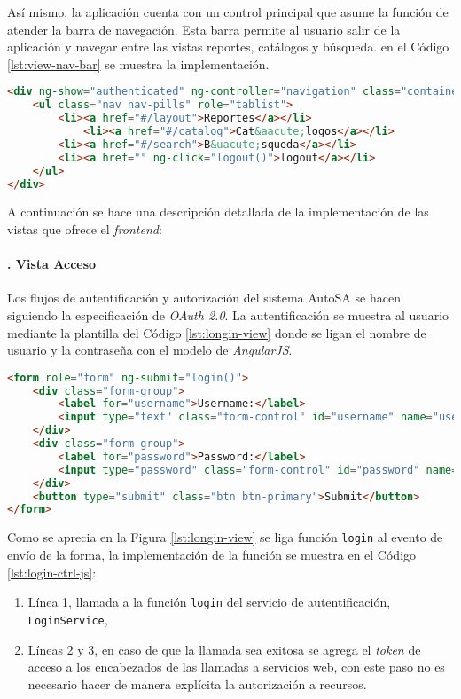 Así mismo, la aplicación cuenta con un control principal que asume la función de atender la barra de navegación. Esta barra permite al usuario salir de la aplicación y navegar entre las vistas reportes, catálogos y búsqueda. en el Código \ref{lst:view-nav-bar} se muestra la implementación.

\begin{lstlisting}[language=HTML, captionpos=b, caption={Barra de navegación}, label={lst:view-nav-bar}]
<div ng-show="authenticated" ng-controller="navigation" class="container">
	<ul class="nav nav-pills" role="tablist">
		<li><a href="#/layout">Reportes</a></li>
			<li><a href="#/catalog">Cat&aacute;logos</a></li> 
		<li><a href="#/search">B&uacute;squeda</a></li>
		<li><a href="" ng-click="logout()">logout</a></li>
	</ul>
</div>
\end{lstlisting}

A continuación se hace una descripción detallada de la implementación de las vistas que ofrece el \textit{frontend}:

\paragraph{. Vista Acceso\\}
Los flujos de autentificación y autorización del sistema AutoSA se hacen siguiendo la especificación de \textit{OAuth 2.0}. La autentificación se muestra al usuario mediante la plantilla del Código \ref{lst:longin-view} donde se ligan el nombre de usuario y la contraseña con el modelo de \textit{AngularJS}.

\begin{lstlisting}[language=HTML, caption={Plantilla HTML de acceso.}, captionpos=b, label={lst:longin-view}]
<form role="form" ng-submit="login()">
	<div class="form-group">
		<label for="username">Username:</label>
		<input type="text" class="form-control" id="username" name="username" ng-model="credentials.username"/>
	</div>
	<div class="form-group">
		<label for="password">Password:</label>
		<input type="password" class="form-control" id="password" name="password" ng-model="credentials.password"/>
	</div>
	<button type="submit" class="btn btn-primary">Submit</button>
</form>
\end{lstlisting}


Como se aprecia en la Figura \ref{lst:longin-view} se liga función \texttt{login} al evento de envío de la forma, la implementación de la función se muestra en el Código \ref{lst:login-ctrl-js}:
\begin{enumerate}
	\item Línea 1, llamada a la función \texttt{login} del servicio de autentificación, \texttt{LoginService},
	\item Líneas 2 y 3, en caso de que la llamada sea exitosa se agrega el \textit{token} de acceso a los encabezados de las llamadas a servicios web, con este paso no es necesario hacer de manera explícita la autorización a recursos.
\end{enumerate}

